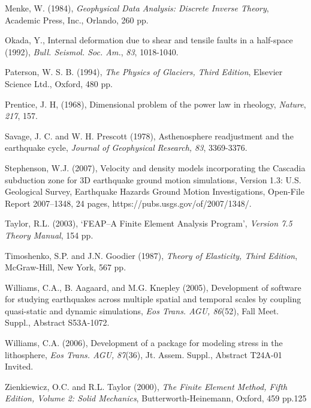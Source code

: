 \begin{thebibliography}{Bibliography}
Menke, W. (1984), \textit{Geophysical
  Data Analysis: Discrete Inverse Theory}, Academic Press, Inc.,
  Orlando, 260 pp.

Okada, Y., Internal deformation due
  to shear and tensile faults in a half-space (1992), \textit{Bull.
    Seismol. Soc. Am.}, \textit{83}, 1018-1040.

Paterson, W. S. B. (1994),
  \textit{The Physics of Glaciers, Third Edition}, Elsevier Science
  Ltd., Oxford, 480 pp.

Prentice, J. H, (1968),
  Dimensional problem of the power law in rheology, \textit{Nature},
  \textit{217}, 157.

Savage,
  J. C. and W. H. Prescott (1978), Asthenosphere readjustment and the
  earthquake cycle, \textit{Journal of Geophysical}
  \textit{Research}\emph{, 83}, 3369-3376.

Stephenson, W.J. (2007),
  Velocity and density models incorporating the Cascadia subduction
  zone for 3D earthquake ground motion simulations, Version 1.3:
  U.S. Geological Survey, Earthquake Hazards Ground Motion
  Investigations, Open-File Report 2007–1348, 24 pages,
  https://pubs.usgs.gov/of/2007/1348/.

Taylor, R.L. (2003), `FEAP--A
  Finite Element Analysis Program', \textit{Version 7.5 Theory
    Manual}, 154 pp.

Timoshenko, S.P. and J.N. Goodier
  (1987), \textit{Theory of Elasticity, Third Edition}, McGraw-Hill,
  New York, 567 pp.

Williams, C.A.,
  B. Aagaard, and M.G. Knepley (2005), Development of software for
  studying earthquakes across multiple spatial and temporal scales by
  coupling quasi-static and dynamic simulations, \emph{Eos Trans. AGU,
    86}(52), Fall Meet. Suppl., Abstract S53A-1072.

Williams, C.A. (2006),
  Development of a package for modeling stress in the lithosphere,
  \emph{Eos Trans.  AGU,} \emph{87}(36), Jt. Assem. Suppl., Abstract
  T24A-01 Invited.

Zienkiewicz, O.C. and R.L. Taylor
  (2000), \textit{The Finite Element Method, Fifth Edition, Volume 2:
  Solid Mechanics}, Butterworth-Heinemann, Oxford, 459 pp.125


\end{thebibliography}

